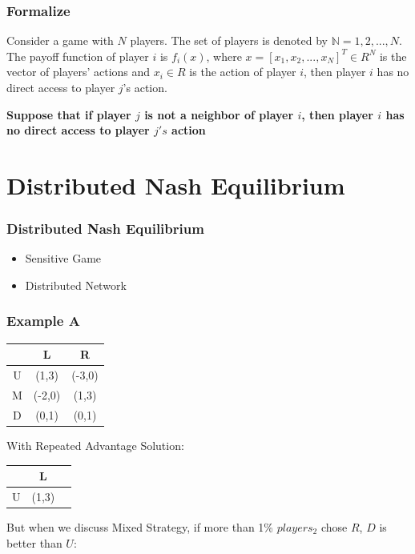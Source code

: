 \documentclass[notheorems, aspectratio=54]{beamer}
\begin{document}
\begin{frame}
  \frametitle{Formalize}
  Consider a game with $N$ players.
  The set of players is denoted by $\mathbb{N}={1, 2, ..., N}$.
  The payoff function of player $i$ is $f_i(x)$,
  where $x = [x_1, x_2,...,x_N]^T \in R^N$ is the vector of players' actions
  and $x_i \in R$ is the action of player $i$,
  then player $i$ has no direct access to player $j$'s action.\newline

  \bfseries{Suppose that if player $j$ is not a neighbor of player $i$, then player $i$ has no direct access to player $j's$ action}
\end{frame}





\section {Distributed Nash Equilibrium}


\begin{frame}
  \frametitle{Distributed Nash Equilibrium}
  \begin{itemize}
    \item Sensitive Game
    \item Distributed Network
  \end{itemize}

\end{frame}


\begin{frame}
  \frametitle{Example A}
  \begin{center}
    \begin{tabular}{c|c|c|}
      & L & R \\
      \hline
      U & (1,3)&(-3,0)\\
      \hline
      M & (-2,0)&(1,3)\\
      \hline
      D & (0,1)&(0,1)\\
    \end{tabular}
  \end{center}
  With Repeated Advantage Solution:
  \begin{center}
    \begin{tabular}{c|c|c|}
      & L \\
      \hline
      U & (1,3)\\
      \hline
    \end{tabular}
  \end{center}
  But when we discuss Mixed Strategy, if more than 1\% $players_2$ chose $R$, $D$ is better than $U$:
\end{frame}
\end{document}
